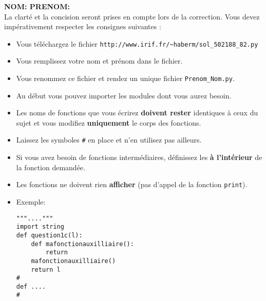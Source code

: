 \documentclass[10pt]{article}
\begin{document}
\vspace*{-1cm}

\noindent
{\bf NOM: \hspace*{5cm} PRENOM:}\\
\noindent
La clarté et la concision seront prises en compte lors de la correction.
Vous devez impérativement respecter les consignes suivantes :
\begin{itemize}
\item Vous téléchargez le fichier \verb+http://www.irif.fr/~haberm/sol_502188_82.py+
        \item Vous remplissez votre nom et prénom dans le fichier.
	\item Vous renommez ce fichier et rendez un unique fichier
              {\tt Prenom\_Nom.py}. 
        \item Au début vous pouvez importer les modules dont vous aurez besoin.
	\item Les noms de fonctions que vous écrirez {\bf doivent rester}
	  identiques à ceux du sujet et vous modifiez {\bf uniquement}
          le corps des fonctions.
          \item Laissez les symboles \verb+#+ en place
          et n'en utilisez pas ailleurs.
        \item Si vous avez besoin de fonctions intermédiaires, définissez les
{\bf à l'intérieur} de la fonction demandée.
        \item Les fonctions ne doivent rien {\bf afficher} (pas d'appel de la fonction \verb+print+).
\item Exemple:
\begin{verbatim}
"""...."""
import string
def question1c(l):
    def mafonctionauxilliaire(): 
        return
    mafonctionauxilliaire() 
    return l
#
def ....
#
\end{verbatim}
\end{itemize}
\end{document}
